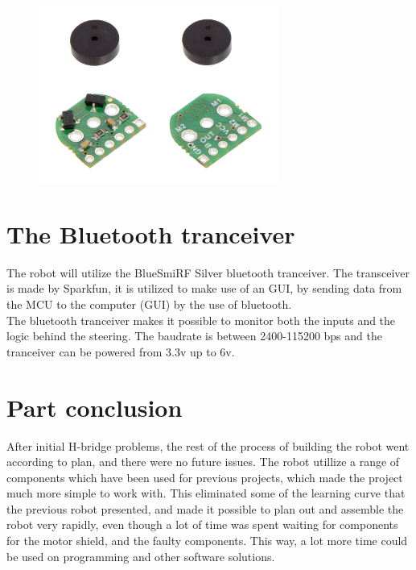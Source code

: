 \begin{figure}[!ht]
	\centering
	\includegraphics[width=0.7\textwidth]{figures/pololuEncoder.jpg}
	\caption{}
	\label{Hardware diagram}
\end{figure}

\section{The Bluetooth tranceiver}
The robot will utilize the BlueSmiRF Silver bluetooth tranceiver. The transceiver is made by Sparkfun, it is utilized to make use of an GUI, by sending data from the MCU to the computer (GUI) by the use of bluetooth.\\ The bluetooth tranceiver makes it possible to monitor both the inputs and the logic behind the steering. The baudrate is between 2400-115200 bps and the tranceiver can be powered from 3.3v up to 6v. 

\section{Part conclusion}
After initial H-bridge problems, the rest of the process of building the robot went according to plan, and there were no future issues. The robot utillize a range of components which have been used for previous projects, which made the project much more simple to work with. This eliminated some of the learning curve that the previous robot presented, and made it possible to plan out and assemble the robot very rapidly, even though a lot of time was spent waiting for components for the motor shield, and the faulty components. This way, a lot more time could be used on programming and other software solutions. 
